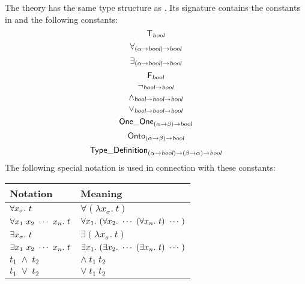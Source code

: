 The theory  has the same type
structure as . Its signature contains the constants in
 and the following constants:
\[
\T_\ty{bool}
\index{T@\holtxt{T}!abstract form of}
\index{truth values, in HOL logic@truth values, in \HOL{} logic!abstract form of}
\]
\[
\forall_{(\alpha\fun\ty{bool})\fun\ty{bool}}
\index{universal quantifier, in HOL logic@universal quantifier, in \HOL{} logic!abstract form of}
\]
\[
\exists_{(\alpha\fun\ty{bool})\fun\ty{bool}}
\index{existential quantifier, in HOL logic@existential quantifier, in \HOL{} logic!abstract form of}
\]
\[
\F_\ty{bool}
\index{F@\holtxt{F}!abstract form of}
\]
\[
\neg_{\ty{bool}\fun\ty{bool}}
\index{negation, in HOL logic@negation, in \HOL{} logic!abstract form of}
\]
\[
\wedge_{\ty{bool}\fun\ty{bool}\fun\ty{bool}}
\index{conjunction, in HOL logic@conjunction, in \HOL{} logic!abstract form of}
\]
\[
\vee_{\ty{bool}\fun\ty{bool}\fun\ty{bool}}
\index{disjunction, in HOL logic@disjunction, in \HOL{} logic!abstract form of}
\]
\[
\OneOne_{(\alpha\fun\beta)\fun\ty\bool}
\index{one-to-one predicate, in HOL logic@one-to-one predicate, in \HOL{} logic!abstract form of}
\]
\[
\Onto_{(\alpha\fun\beta)\fun\ty\bool}
\index{onto predicate, in HOL logic@onto predicate, in \HOL{} logic!abstract form of}
\]
\[
{\sf Type\_Definition}_{(\alpha{\to}\textsl{bool}){\to}(\beta{\to}\alpha){\to}\textsl{bool}}
\]
The following special notation is used in connection with these constants:
\begin{center}
\begin{tabular}{|l|l|}\hline
{\rm Notation} & {\rm Meaning}\\ \hline $\forall x_{\sigma}.\ t$ &
$\forall(\lambda x_{\sigma}.\ t)$\\ \hline $\uquant{x_1\ x_2\ \cdots\
x_n}t$ & $\forall x_1.\ (\forall x_2.\  \cdots\ (\forall x_n.\ t)
\ \cdots\ )$\\ \hline
$\exists x_{\sigma}.\ t$
  & $\exists(\lambda x_{\sigma}.\ t)$\\ \hline
$\equant{x_1\ x_2\ \cdots\ x_n}t$
  & $\exists x_1.\ (\exists x_2.\  \cdots\ (\exists x_n.\ t)
\ \cdots\ )$\\ \hline
$t_1\ \wedge\ t_2$  & $\wedge\ t_1\ t_2$\\ \hline
$t_1\ \vee\ t_2$  & $\vee\ t_1\ t_2$\\ \hline
\end{tabular}\end{center}

